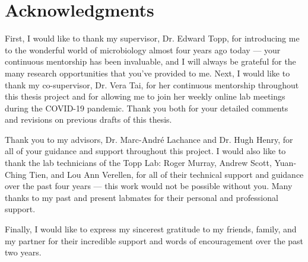 \chapter*{Acknowledgments}

First, I would like to thank my supervisor, Dr. Edward Topp, for introducing me to the wonderful world of microbiology almost four years ago today --- your continuous mentorship has been invaluable, and I will always be grateful for the many research opportunities that you've provided to me.
Next, I would like to thank my co-supervisor, Dr. Vera Tai, for her continuous mentorship throughout this thesis project and for allowing me to join her weekly online lab meetings during the COVID-19 pandemic.
Thank you both for your detailed comments and revisions on previous drafts of this thesis.

Thank you to my advisors, Dr. Marc-André Lachance and Dr. Hugh Henry, for all of your guidance and support throughout this project.
I would also like to thank the lab technicians of the Topp Lab:
Roger Murray, Andrew Scott, Yuan-Ching Tien, and Lou Ann Verellen, for all of their technical support and guidance over the past four years --- this work would not be possible without you.
Many thanks to my past and present labmates for their personal and professional support.

Finally, I would like to express my sincerest gratitude to my friends, family, and my partner for their incredible support and words of encouragement over the past two years.
